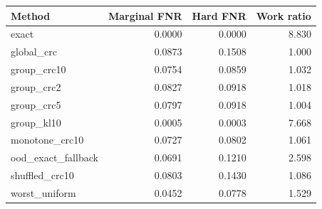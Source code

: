 \begin{tabular}{lrrr}
\hline
Method & Marginal FNR & Hard FNR & Work ratio \\
\hline
exact & 0.0000 & 0.0000 & 8.830 \\
global\_crc & 0.0873 & 0.1508 & 1.000 \\
group\_crc10 & 0.0754 & 0.0859 & 1.032 \\
group\_crc2 & 0.0827 & 0.0918 & 1.018 \\
group\_crc5 & 0.0797 & 0.0918 & 1.004 \\
group\_kl10 & 0.0005 & 0.0003 & 7.668 \\
monotone\_crc10 & 0.0727 & 0.0802 & 1.061 \\
ood\_exact\_fallback & 0.0691 & 0.1210 & 2.598 \\
shuffled\_crc10 & 0.0803 & 0.1430 & 1.086 \\
worst\_uniform & 0.0452 & 0.0778 & 1.529 \\
\hline
\end{tabular}
